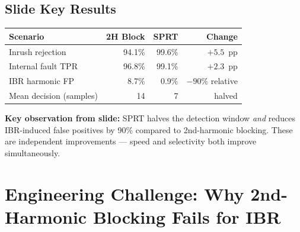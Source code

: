 \documentclass[12pt,a4paper]{article}
\begin{document}
\subsection{Slide Key Results}

\begin{center}
\begin{tabular}{@{}lrrr@{}}
\toprule
\textbf{Scenario} & \textbf{2H Block} & \textbf{SPRT} & \textbf{Change} \\
\midrule
Inrush rejection       & 94.1\% & 99.6\% & $+5.5$~pp \\
Internal fault TPR     & 96.8\% & 99.1\% & $+2.3$~pp \\
IBR harmonic FP        & 8.7\%  & 0.9\%  & $-90\%$ relative \\
Mean decision (samples)& 14     & 7      & halved \\
\bottomrule
\end{tabular}
\end{center}

\textbf{Key observation from slide:} SPRT halves the detection window \textit{and} reduces IBR-induced false positives by 90\% compared to 2nd-harmonic blocking. These are independent improvements --- speed and selectivity both improve simultaneously.

\section{Engineering Challenge: Why 2nd-Harmonic Blocking Fails for IBR}
\end{document}
